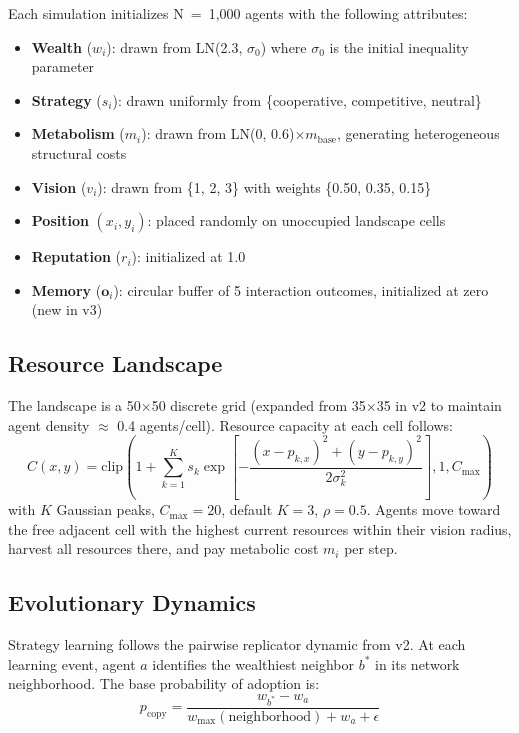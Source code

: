 \documentclass[12pt, letterpaper]{article}
\begin{document}
Each simulation initializes N~=~1,000 agents with the following
attributes:
\begin{itemize}
  \item \textbf{Wealth} ($w_i$): drawn from LN(2.3, $\sigma_0$) where
    $\sigma_0$ is the initial inequality parameter
  \item \textbf{Strategy} ($s_i$): drawn uniformly from
    \{cooperative, competitive, neutral\}
  \item \textbf{Metabolism} ($m_i$): drawn from
    LN(0, 0.6)$\times m_{\text{base}}$, generating heterogeneous
    structural costs
  \item \textbf{Vision} ($v_i$): drawn from \{1, 2, 3\} with weights
    \{0.50, 0.35, 0.15\}
  \item \textbf{Position} $(x_i, y_i)$: placed randomly on unoccupied
    landscape cells
  \item \textbf{Reputation} ($r_i$): initialized at 1.0
  \item \textbf{Memory} ($\mathbf{o}_i$): circular buffer of 5
    interaction outcomes, initialized at zero (new in v3)
\end{itemize}

\subsection{Resource Landscape}

The landscape is a 50$\times$50 discrete grid (expanded from 35$\times$35
in v2 to maintain agent density $\approx$ 0.4 agents/cell). Resource
capacity at each cell follows:
\begin{equation}
  C(x,y) = \text{clip}\!\left(1 + \sum_{k=1}^{K} s_k \exp\!\left[
    -\frac{(x-p_{k,x})^2 + (y-p_{k,y})^2}{2\sigma_k^2}
  \right], 1, C_{\max}\right)
\end{equation}
with $K$ Gaussian peaks, $C_{\max} = 20$, default $K = 3$, $\rho = 0.5$.
Agents move toward the free adjacent cell with the highest current
resources within their vision radius, harvest all resources there, and
pay metabolic cost $m_i$ per step.

\subsection{Evolutionary Dynamics}

Strategy learning follows the pairwise replicator dynamic from v2. At
each learning event, agent $a$ identifies the wealthiest neighbor $b^*$
in its network neighborhood. The base probability of adoption is:
\begin{equation}
  p_{\text{copy}} = \frac{w_{b^*} - w_a}
    {w_{\max}(\text{neighborhood}) + w_a + \epsilon}
\end{equation}
\end{document}
